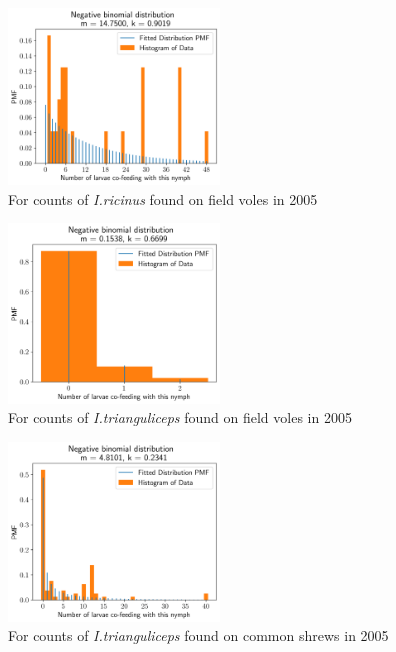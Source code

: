 \documentclass{article}
\begin{document}
\begin{figure}[]
	\begin{mdframed}[backgroundcolor=grey250,rightline=false,leftline=false,topline=false]
	\includegraphics[width=0.5\textwidth, center]{coaggregation_dist_2005_I.ricinus_FV.png}
	\caption{For counts of \textit{I.ricinus} found on field voles in 2005}\label{fig:distFit_2005_Iricinus_FV}
	\end{mdframed}
\end{figure}

\begin{figure}[]
	\begin{mdframed}[backgroundcolor=grey250,rightline=false,leftline=false,topline=false]
	\includegraphics[width=0.5\textwidth, center]{coaggregation_dist_2005_I.trianguliceps_FV.png}
	\caption{For counts of \textit{I.trianguliceps} found on field voles in 2005}\label{fig:distFit_2005_Itrianguliceps_FV}
	\end{mdframed}
\end{figure}

\begin{figure}[]
	\begin{mdframed}[backgroundcolor=grey250,rightline=false,leftline=false,topline=false]
	\includegraphics[width=0.5\textwidth, center]{coaggregation_dist_2005_I.trianguliceps_SA.png}
	\caption{For counts of \textit{I.trianguliceps} found on common shrews in 2005}\label{fig:distFit_2005_Itrianguliceps_SA}
	\end{mdframed}
\end{figure}
\end{document}
